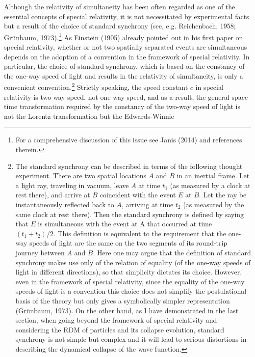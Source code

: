 Although the relativity of simultaneity has been often regarded as one of the essential concepts of special relativity, it is not necessitated by experimental facts but a result of the choice of standard synchrony (see, e.g. Reichenbach, 1958; Gr\"{u}nbaum, 1973).\footnote{For a comprehensive discussion of this issue see Janis (2014) and references therein.} As Einstein (1905) already pointed out in his first paper on special relativity, whether or not two spatially separated events are simultaneous depends on the adoption of a convention in the framework of special relativity. In particular, the choice of standard synchrony, which is based on the constancy of the one-way speed of light and results in the relativity of simultaneity, is only a convenient convention.\footnote{The standard synchrony can be described in terms of the following thought experiment. There are two spatial locations $A$ and $B$ in an inertial frame. Let a light ray, traveling in vacuum, leave $A$ at time $t_1$ (as measured by a clock at rest there), and arrive at $B$ coincident with the event $E$ at $B$. Let the ray be instantaneously reflected back to $A$, arriving at time $t_2$ (as measured by the same clock at rest there). Then the standard synchrony is defined by saying that $E$ is simultaneous with the event at A that occurred at time $(t_1+t_2)/2$. This definition is equivalent to the requirement that the one-way speeds of light are the same on the two segments of its round-trip journey between $A$ and $B$. Here one may argue that the definition of standard synchrony makes use only of the relation of equality (of the one-way speeds of light in different directions), so that simplicity dictates its choice. However, even in the framework of special relativity, since the equality of the one-way speeds of light is a convention this choice does not simplify the postulational basis of the theory but only gives a symbolically simpler representation (Gr\"{u}nbaum, 1973). On the other hand, as I have demonstrated in the last section, when going beyond the framework of special relativity and considering the RDM of particles and its collapse evolution, standard synchrony is not simple but complex and it will lead to serious distortions in describing the dynamical collapse of the wave function.} Strictly speaking, the speed constant $c$ in special relativity is two-way speed, not one-way speed, and as a result, the general space-time transformation required by the constancy of the two-way speed of light is not the Lorentz transformation but the Edwards-Winnie 